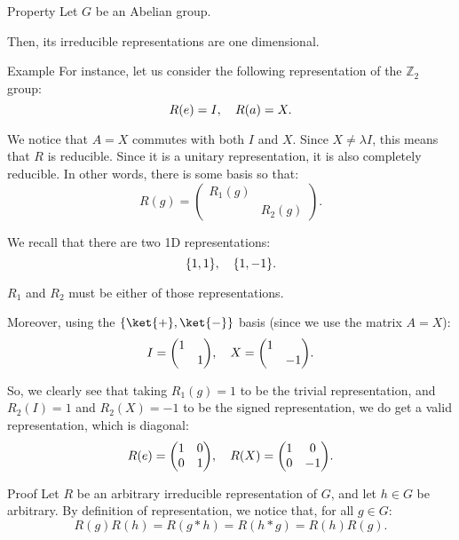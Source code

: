 \documentclass[a4paper]{article}
\begin{document}
\begin{parag}{Property}
    Let $G$ be an Abelian group.

    Then, its irreducible representations are one dimensional.

    \begin{subparag}{Example}
        For instance, let us consider the following representation of the $\mathbb{Z}_2$ group: 
        \[R\left(e\right) = I, \mathspace R\left(a\right) = X.\]

        We notice that $A = X$ commutes with both $I$ and $X$. Since $X \neq \lambda I$, this means that $R$ is reducible. Since it is a unitary representation, it is also completely reducible. In other words, there is some basis so that: 
        \[R\left(g\right) = \begin{pmatrix} R_1\left(g\right) &  \\  & R_2\left(g\right) \end{pmatrix}.\]
        
        We recall that there are two 1D representations: 
        \[\left\{1, 1\right\}, \mathspace \left\{1, -1\right\}.\]

        $R_1$ and $R_2$ must be either of those representations. 

        Moreover, using the $\left\{\ket{+}, \ket{-}\right\}$ basis (since we use the matrix $A = X$):  
        \[I = \begin{pmatrix} 1 &  \\  & 1 \end{pmatrix}, \mathspace X = \begin{pmatrix} 1 &  \\  & -1 \end{pmatrix}.\]

        So, we clearly see that taking $R_1\left(g\right) = 1$ to be the trivial representation, and $R_2\left(I\right) = 1$ and $R_2\left(X\right) = -1$ to be the signed representation, we do get a valid representation, which is diagonal: 
        \[R\left(e\right) = \begin{pmatrix} 1 & 0 \\ 0 & 1 \end{pmatrix}, \mathspace R\left(X\right) = \begin{pmatrix} 1 & 0 \\ 0 & -1 \end{pmatrix}.\]
    \end{subparag}

    \begin{subparag}{Proof}
        Let $R$ be an arbitrary irreducible representation of $G$, and let $h \in G$ be arbitrary. By definition of representation, we notice that, for all $g \in G$: 
        \[R\left(g\right) R\left(h\right) = R\left(g * h\right) = R\left(h * g\right) = R\left(h\right)R\left(g\right).\]


\end{subparag}
\end{parag}
\end{document}
